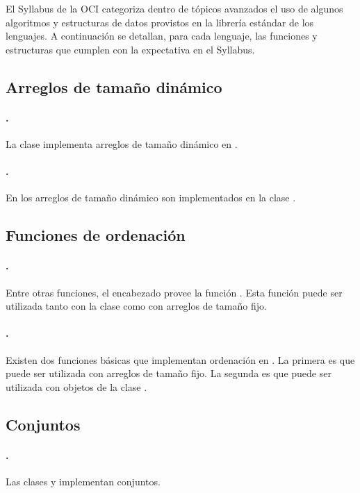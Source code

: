 El Syllabus de la OCI categoriza dentro de tópicos avanzados el uso de algunos
algoritmos y estructuras de datos provistos en la librería estándar de los
lenguajes.
A continuación se detallan, para cada lenguaje, las funciones y estructuras que
cumplen con la expectativa en el Syllabus.

\subsection{Arreglos de tamaño dinámico}
\label{tech-dynamic-array}
\paragraph{\cpp.} La clase  implementa arreglos de tamaño dinámico en
  \cpp.
\paragraph{\java.} En \java los arreglos de tamaño dinámico son implementados en la
  clase .

\subsection{Funciones de ordenación}
\label{tech-sort-functions}
\paragraph{\cpp.} Entre otras funciones, el encabezado  provee la
  función .
  Esta función puede ser utilizada tanto con la clase  como con
  arreglos de tamaño fijo.
\paragraph{\java.} Existen dos funciones básicas que implementan ordenación en
  \java.
  La primera es  que puede ser utilizada con arreglos de
  tamaño fijo.
  La segunda es  que puede ser utilizada con objetos de
  la clase .
  
\subsection{Conjuntos}
\label{tech-set}
\paragraph{\cpp.} Las clases  y  implementan
  conjuntos.
